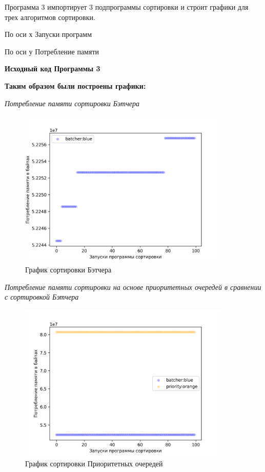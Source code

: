 Программа 3 импортирует 3 подпрограммы сортировки и строит графики для трех алгоритмов сортировки.

По оси х Запуски программ

По оси у Потребление памяти

\textbf{Исходный код Программы 3}




\textbf{Таким образом были построены графики:}

\textit{Потребление памяти сортировки Бэтчера}

\begin{figure}[H]
    \centering
    \includegraphics[width=0.9\textwidth]{./plots/batcher_memory.png}
    \caption{График сортировки Бэтчера}
\end{figure}


\textit{Потребление памяти сортировки на основе приоритетных очередей в сравнении с сортировкой Бэтчера}

\begin{figure}[H]
    \centering
    \includegraphics[width=0.9\textwidth]{./plots/priority_memory.png}
    \caption{График сортировки Приоритетных очередей}
\end{figure}



